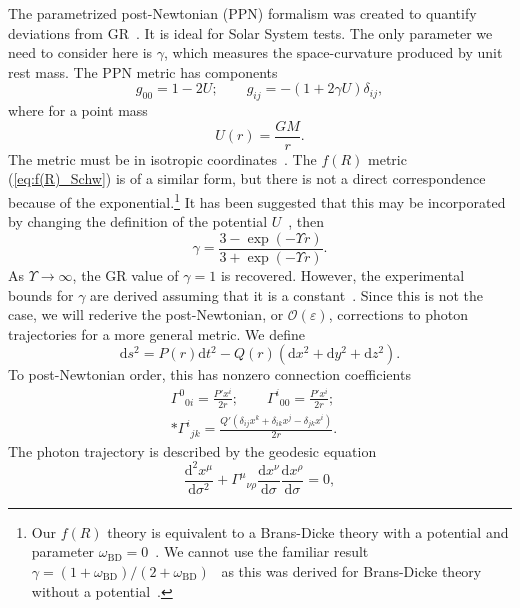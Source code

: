 \documentclass[aps,prd,amsfonts,amssymb,amsmath,nofootinbib,reprint,showpacs]{revtex4-1}
\newcommand{\eqnref}[1]{(\ref{eq:#1})}
\newcommand{\sub}[1]{\ensuremath{_\text{#1}}}
\newcommand{\dd}{\ensuremath{\text{d}}}
\newcommand{\diff}[2]{\ensuremath{\frac{\dd {#1}}{\dd {#2}}}}
\newcommand{\difftwo}[2]{\ensuremath{\frac{\dd^2 {#1}}{\dd {#2}^2}}}
\newcommand{\order}[1]{\ensuremath{\mathcal{O}({#1})}}
\begin{document}
The parametrized post-Newtonian (PPN) formalism was created to quantify deviations from GR~\cite{Will1993, Will2006}. It is ideal for Solar System tests. The only parameter we need to consider here is $\gamma$, which measures the space-curvature produced by unit rest mass. The PPN metric has components
\begin{equation}
g_{00} = 1 - 2U; \qquad g_{ij} = -(1 + 2\gamma U)\delta_{ij},
\end{equation}
where for a point mass
\begin{equation}
U(r) = \frac{GM}{r}.
\end{equation}
The metric must be in isotropic coordinates~\cite{Misner1973,Will1993}. The $f(R)$ metric \eqnref{f(R)_Schw} is of a similar form, but there is not a direct correspondence because of the exponential.\footnote{Our $f(R)$ theory is equivalent to a Brans-Dicke theory with a potential and parameter $\omega\sub{BD} = 0$~\cite{Teyssandier1983, Wands1994}. We cannot use the familiar result $\gamma = (1 + \omega\sub{BD})/(2 + \omega\sub{BD})$~\cite{Will2006} as this was derived for Brans-Dicke theory without a potential~\cite{Will1993}.} It has been suggested that this may be incorporated by changing the definition of the potential $U$~\cite{Olmo2007c, Faulkner2007, Bisabr2010, DeFelice2010}, then
\begin{equation}
\gamma = \frac{3 - \exp(-\Upsilon r)}{3 + \exp(-\Upsilon r)}.
\end{equation}
As $\Upsilon \rightarrow \infty$, the GR value of $\gamma = 1$ is recovered. However, the experimental bounds for $\gamma$ are derived assuming that it is a constant~\cite{Will1993}. Since this is not the case, we will rederive the post-Newtonian, or $\order{\varepsilon}$, corrections to photon trajectories for a more general metric. We define
\begin{equation}
\dd s^2 = P(r)\dd t^2 - Q(r)\left(\dd x^2 + \dd y^2 + \dd z^2\right).
\end{equation}
To post-Newtonian order, this has nonzero connection coefficients
\begin{equation}
\begin{split}
{\Gamma^0}_{0i} = \frac{P'x^i}{2r}; \qquad {\Gamma^i}_{00} = \frac{P'x^i}{2r}; \quad\\*
{\Gamma^i}_{jk} = \frac{Q'(\delta_{ij}x^k + \delta_{ik}x^j-\delta_{jk}x^i)}{2r}.
\end{split}
\end{equation}
The photon trajectory is described by the geodesic equation
\begin{equation}
\difftwo{x^\mu}{\sigma} + {\Gamma^\mu}_{\nu\rho}\diff{x^\nu}{\sigma}\diff{x^\rho}{\sigma} = 0,
\label{eq:Geodesic}
\end{equation}
\end{document}
